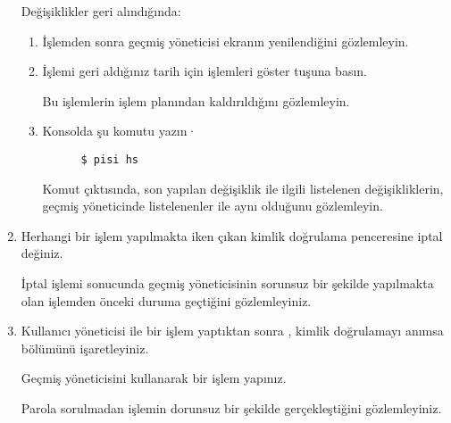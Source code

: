 \documentclass[a4paper,10pt]{article}
\begin{document}
\begin{enumerate}
      Değişiklikler geri alındığında:
\begin{enumerate}
        \item İşlemden sonra geçmiş yöneticisi ekranın yenilendiğini gözlemleyin.
        \item İşlemi geri aldığınız tarih için işlemleri göster tuşuna basın.

	Bu işlemlerin işlem planından kaldırıldığını gözlemleyin.
     	\item Konsolda şu komutu yazın·
      \begin{verbatim}
	  $ pisi hs
      \end{verbatim} 
       Komut çıktısında, son yapılan değişiklik ile ilgili listelenen değişikliklerin, geçmiş yöneticinde listelenenler ile aynı olduğunu gözlemleyin.

\end{enumerate}

\item Herhangi bir işlem yapılmakta iken çıkan kimlik doğrulama penceresine iptal değiniz.

İptal işlemi sonucunda geçmiş yöneticisinin sorunsuz bir şekilde yapılmakta olan işlemden önceki duruma geçtiğini gözlemleyiniz.

\item Kullanıcı yöneticisi ile bir işlem yaptıktan sonra , kimlik doğrulamayı anımsa bölümünü işaretleyiniz.

Geçmiş yöneticisini kullanarak bir işlem yapınız.

Parola sorulmadan işlemin dorunsuz bir şekilde gerçekleştiğini gözlemleyiniz.
\end{enumerate}
\end{document}
